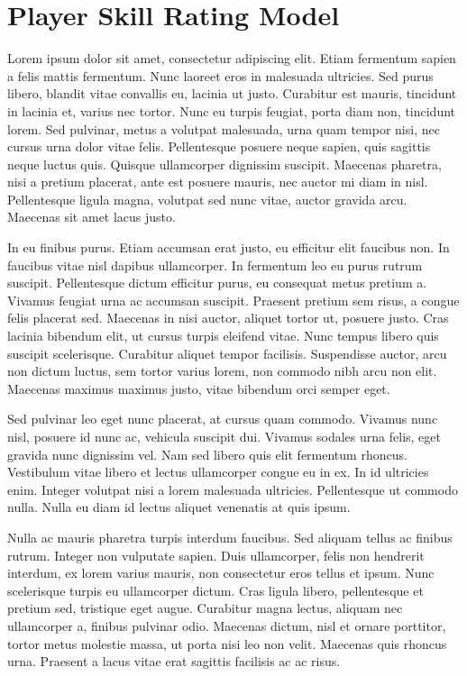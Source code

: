 \section{Player Skill Rating Model}
\label{sec:player_skill_rating}

Lorem ipsum dolor sit amet, consectetur adipiscing elit. Etiam fermentum sapien a felis mattis fermentum. Nunc laoreet eros in malesuada ultricies. Sed purus libero, blandit vitae convallis eu, lacinia ut justo. Curabitur est mauris, tincidunt in lacinia et, varius nec tortor. Nunc eu turpis feugiat, porta diam non, tincidunt lorem. Sed pulvinar, metus a volutpat malesuada, urna quam tempor nisi, nec cursus urna dolor vitae felis. Pellentesque posuere neque sapien, quis sagittis neque luctus quis. Quisque ullamcorper dignissim suscipit. Maecenas pharetra, nisi a pretium placerat, ante est posuere mauris, nec auctor mi diam in nisl. Pellentesque ligula magna, volutpat sed nunc vitae, auctor gravida arcu. Maecenas sit amet lacus justo.

\vspace{2mm}

In eu finibus purus. Etiam accumsan erat justo, eu efficitur elit faucibus non. In faucibus vitae nisl dapibus ullamcorper. In fermentum leo eu purus rutrum suscipit. Pellentesque dictum efficitur purus, eu consequat metus pretium a. Vivamus feugiat urna ac accumsan suscipit. Praesent pretium sem risus, a congue felis placerat sed. Maecenas in nisi auctor, aliquet tortor ut, posuere justo. Cras lacinia bibendum elit, ut cursus turpis eleifend vitae. Nunc tempus libero quis suscipit scelerisque. Curabitur aliquet tempor facilisis. Suspendisse auctor, arcu non dictum luctus, sem tortor varius lorem, non commodo nibh arcu non elit. Maecenas maximus maximus justo, vitae bibendum orci semper eget.

\vspace{2mm}

Sed pulvinar leo eget nunc placerat, at cursus quam commodo. Vivamus nunc nisl, posuere id nunc ac, vehicula suscipit dui. Vivamus sodales urna felis, eget gravida nunc dignissim vel. Nam sed libero quis elit fermentum rhoncus. Vestibulum vitae libero et lectus ullamcorper congue eu in ex. In id ultricies enim. Integer volutpat nisi a lorem malesuada ultricies. Pellentesque ut commodo nulla. Nulla eu diam id lectus aliquet venenatis at quis ipsum.

\vspace{2mm}

Nulla ac mauris pharetra turpis interdum faucibus. Sed aliquam tellus ac finibus rutrum. Integer non vulputate sapien. Duis ullamcorper, felis non hendrerit interdum, ex lorem varius mauris, non consectetur eros tellus et ipsum. Nunc scelerisque turpis eu ullamcorper dictum. Cras ligula libero, pellentesque et pretium sed, tristique eget augue. Curabitur magna lectus, aliquam nec ullamcorper a, finibus pulvinar odio. Maecenas dictum, nisl et ornare porttitor, tortor metus molestie massa, ut porta nisi leo non velit. Maecenas quis rhoncus urna. Praesent a lacus vitae erat sagittis facilisis ac ac risus.

